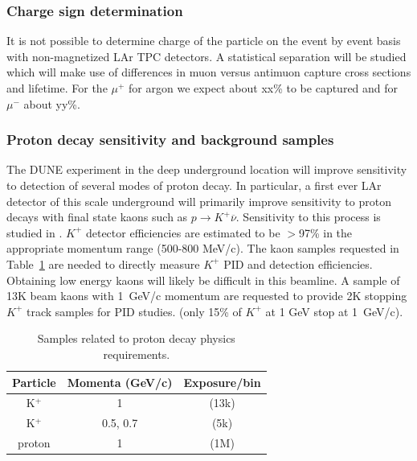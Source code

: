 \subsubsection{Charge sign determination}
It is not possible to determine charge of the particle on the event by event basis with non-magnetized LAr TPC detectors. A statistical separation will be studied which will make use of differences in muon versus antimuon capture cross sections and lifetime.
For the $\mu^+$ for argon we expect about xx\% to be captured and for $\mu^-$ about yy\%. 




\subsubsection{Proton decay sensitivity and background samples}


The DUNE experiment in the deep underground location will improve sensitivity to detection of several modes of proton decay.
In particular, a first ever LAr detector of this scale underground will primarily improve sensitivity to 
proton decays with final state kaons such as  $p \rightarrow K^+ \overline{\nu}$. 
Sensitivity to this process is studied in \cite{bueno}. $K^+$ detector efficiencies are estimated to be $>$97\% in the
appropriate momentum range (500-800 MeV/c). The kaon samples requested in Table~\ref{pdktable} are needed to directly measure 
$K^+$ PID and detection efficiencies. Obtaining low energy kaons will likely be difficult in this beamline.
A sample of 13K beam kaons with 1~GeV/c momentum are requested to provide 2K stopping $K^+$ track samples for PID studies.
(only 15\% of $K^+$ at 1 GeV stop at 1~GeV/c).


\begin{table}[h]
\centering
\begin{tabular}{|c|c|c|}
\hline
Particle     & Momenta (GeV/c) & Exposure/bin  \\ \hline
\hline
K$^+$  &  1 & (13k)    \\ \hline
K$^+$  & 0.5, 0.7 & (5k)   \\ \hline
proton &  1  &  (1M)  \\ \hline
\end{tabular}\caption{Samples related to proton decay physics requirements.}
\label{pdktable}
\end{table}

